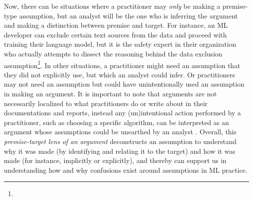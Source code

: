 Now, there can be situations where a practitioner may \textit{only} be making a premise-type assumption, but an analyst will be the one who is inferring the argument and making a distinction between premise and target. 
For instance, an ML developer can exclude certain text sources from the data and proceed with training their language model, but it is the safety expert in their organization who actually attempts to dissect the reasoning behind the data exclusion assumption\footnote{}. 
In other situations, a practitioner might need an assumption that they did not explicitly use, but which an analyst could infer. Or practitioners may not need an assumption but could have unintentionally used an assumption in making an argument. It is important to note that arguments are not necessarily localized to what practitioners do or write about in their documentations and reports, instead any (un)intentional action performed by a practitioner, such as choosing a specific algorithm, can be interpreted as an argument whose assumptions could be unearthed by an analyst \cite{kjeldsen2015study,groarke2015going}. Overall, this \textit{premise-target lens of an argument} deconstructs an assumption to understand why it was made (by identifying and relating it to the target) and how it was made (for instance, implicitly or explicitly), and thereby can support us in understanding how and why confusions exist around assumptions in ML practice.





